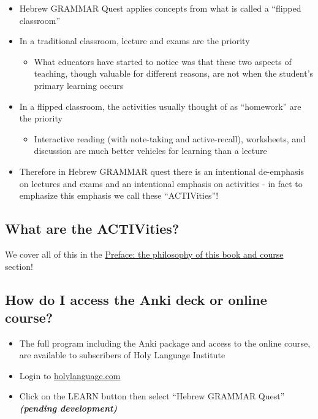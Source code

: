 \documentclass[
]{turabian-researchpaper}
\providecommand{\tightlist}{%
  \setlength{\itemsep}{0pt}\setlength{\parskip}{0pt}}
\begin{document}
\begin{itemize}
\tightlist
\item
  Hebrew GRAMMAR Quest applies concepts from what is called a ``flipped classroom''
\item
  In a traditional classroom, lecture and exams are the priority

  \begin{itemize}
  \tightlist
  \item
    What educators have started to notice was that these two aspects of teaching, though valuable for different reasons, are not when the student's primary learning occurs
  \end{itemize}
\item
  In a flipped classroom, the activities usually thought of as ``homework'' are the priority

  \begin{itemize}
  \tightlist
  \item
    Interactive reading (with note-taking and active-recall), worksheets, and discussion are much better vehicles for learning than a lecture
  \end{itemize}
\item
  Therefore in Hebrew GRAMMAR quest there is an intentional de-emphasis on lectures and exams and an intentional emphasis on activities - in fact to emphasize this emphasis we call these ``ACTIVities''!
\end{itemize}

\hypertarget{what-are-the-activities}{%
\subsection*{What are the ACTIVities?}\label{what-are-the-activities}}

We cover all of this in the \protect\hyperlink{preface}{Preface: the philosophy of this book and course} section!

\hypertarget{how-do-i-access-the-anki-deck-or-online-course}{%
\subsection*{How do I access the Anki deck or online course?}\label{how-do-i-access-the-anki-deck-or-online-course}}

\begin{itemize}
\tightlist
\item
  The full program including the Anki package and access to the online course, are available to subscribers of Holy Language Institute
\item
  Login to \url{holylanguage.com}
\item
  Click on the LEARN button then select ``Hebrew GRAMMAR Quest'' \textbf{\emph{(pending development)}}
\end{itemize}
\end{document}
